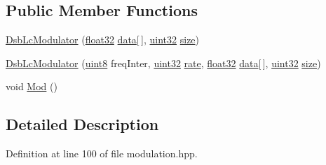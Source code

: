\subsection*{Public Member Functions}
\begin{DoxyCompactItemize}
\item 
\hyperlink{classradio_1_1DsbLcModulator_a26c13b2fa95c6ff4cd769abaa4749f4b}{Dsb\+Lc\+Modulator} (\hyperlink{definitions_8hpp_aacdc525d6f7bddb3ae95d5c311bd06a1}{float32} \hyperlink{classradio_1_1Modulator_a39d698f7720aa3677ecaf1baf83c8fa0}{data}\mbox{[}$\,$\mbox{]}, \hyperlink{definitions_8hpp_a1134b580f8da4de94ca6b1de4d37975e}{uint32} \hyperlink{classradio_1_1Modulator_ad1fbba4bdd6a8c8d2ff05cb7be60fc5c}{size})
\item 
\hyperlink{classradio_1_1DsbLcModulator_a2ffec261c4988ab9405004320781d668}{Dsb\+Lc\+Modulator} (\hyperlink{definitions_8hpp_adde6aaee8457bee49c2a92621fe22b79}{uint8} freq\+Inter, \hyperlink{definitions_8hpp_a1134b580f8da4de94ca6b1de4d37975e}{uint32} \hyperlink{classradio_1_1Modulator_a8901a2170e850a767dd40f9494dd7536}{rate}, \hyperlink{definitions_8hpp_aacdc525d6f7bddb3ae95d5c311bd06a1}{float32} \hyperlink{classradio_1_1Modulator_a39d698f7720aa3677ecaf1baf83c8fa0}{data}\mbox{[}$\,$\mbox{]}, \hyperlink{definitions_8hpp_a1134b580f8da4de94ca6b1de4d37975e}{uint32} \hyperlink{classradio_1_1Modulator_ad1fbba4bdd6a8c8d2ff05cb7be60fc5c}{size})
\item 
void \hyperlink{classradio_1_1DsbLcModulator_ad6b7f8af29cadd93ffa104e598485c25}{Mod} ()
\end{DoxyCompactItemize}


\subsection{Detailed Description}


Definition at line 100 of file modulation.\+hpp.



